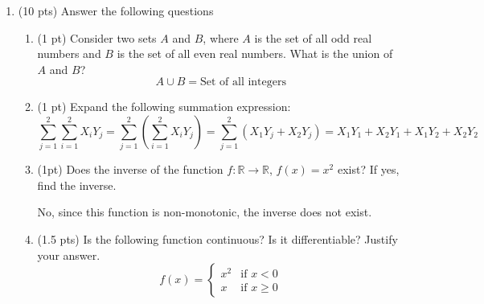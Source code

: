 \documentclass{./../../Latex/tests}
\begin{document}
\thispagestyle{plain}
\vspace{0.5em}

\begin{enumerate}	

\item (10 pts) Answer the following questions
\begin{enumerate}
\item (1 pt) Consider two sets $A$ and $B$, where $A$ is the set of all odd real numbers and $B$ is the set of all even real numbers. What is the union of $A$ and $B$? 
$$ A \cup B = \text{Set of all integers} $$
\item (1 pt) Expand the following summation expression: $$\sum_{j=1}^2  \sum_{i=1}^2 X_i Y_j = \sum_{j=1}^2  \left(\sum_{i=1}^2 X_i Y_j \right) = \sum_{j=1}^2 \left( X_1 Y_j + X_2 Y_j \right) = X_1 Y_1 + X_2 Y_1 + X_1 Y_2 + X_2 Y_2 $$
 \vspace{1em}
\item (1pt) Does the inverse of the function $f: \mathbb{R} \rightarrow \mathbb{R}$, $f(x)=x^2$ exist? If yes, find the inverse. 

No, since this function is non-monotonic, the inverse does not exist. \\

\item (1.5 pts) Is the following function continuous? Is it differentiable? Justify your answer.
$$ f(x) = 
    \begin{cases} 
    x^2 & \text{if } x < 0 \\
    x & \text{if } x \geq 0 
    \end{cases} $$


\end{enumerate}
\end{enumerate}
\end{document}
